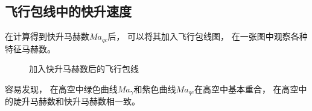 \subsection{飞行包线中的快升速度}

在计算得到快升马赫数$Ma_{qc}$后，
可以将其加入飞行包线图，
在一张图中观察各种特征马赫数。

\begin{figure}[H]
    \centering
    \caption{加入快升马赫数后的飞行包线}
    \label{加入快升马赫数后的飞行包线}
\end{figure}

容易发现，
在高空中绿色曲线$Ma_{\gamma}$和紫色曲线$Ma_{qc}$在高空中基本重合，
在高空中的陡升马赫数和快升马赫数相一致。
